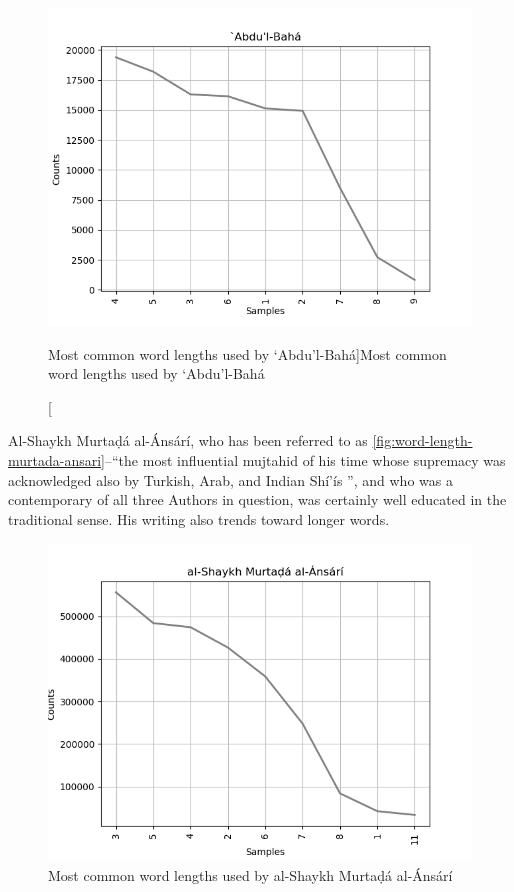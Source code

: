 \documentclass[12pt, oneside]{report}
\begin{document}
\begin{figure}[htb]
	\centering
	\includegraphics[width=15cm]{figures/word-length-abdulbaha.png}
	\caption[Most common word lengths used by `Abdu'l-Bah\'{a}]{Most common word lengths used by `Abdu'l-Bah\'{a}}
	\label{fig:word-length-abdulbaha}
\end{figure}
\par
Al-Shaykh Murtaḍ\'{a} al-\'{A}ns\'{a}r\'{i}, who has been referred to as \autoref{fig:word-length-murtada-ansari}–``the most influential mujtahid of his time whose supremacy was acknowledged also by Turkish, Arab, and Indian Sh\'{i}'\'{i}s \cite{abd_al-hadi_hairi_shiism_1977}'', and who was a contemporary of all three Authors in question, was certainly well educated in the traditional sense.
His writing also trends toward longer words.
\begin{figure}[htb]
	\centering
	\includegraphics[width=15cm]{figures/word-length-shaykh-murtada.png}
	\caption[Most common word lengths used by al-Shaykh Murtaḍ\'{a} al-\'{A}ns\'{a}r\'{i}]{Most common word lengths used by al-Shaykh Murtaḍ\'{a} al-\'{A}ns\'{a}r\'{i}}
	\label{fig:word-length-murtada-ansari}
\end{figure}
\end{document}

